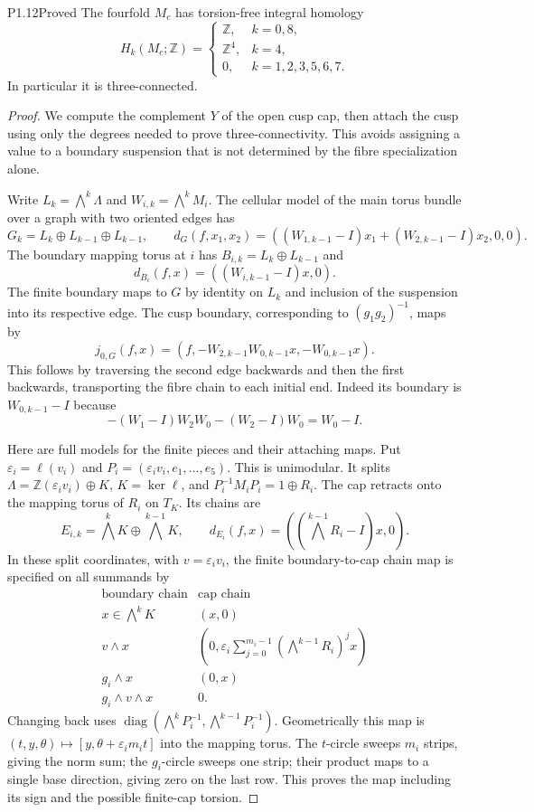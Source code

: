\begin{statement}{P1.12}{Proved}
The fourfold $M_c$ has torsion-free integral homology
\[
H_k(M_c;\mathbb Z)=
\begin{cases}
\mathbb Z,&k=0,8,\\
\mathbb Z^4,&k=4,\\
0,&k=1,2,3,5,6,7.
\end{cases}
\]
In particular it is three-connected.
\end{statement}
\begin{proof}
We compute the complement $Y$ of the open cusp cap, then attach the
cusp using only the degrees needed to prove three-connectivity.
This avoids assigning a value to a boundary suspension that is not
determined by the fibre specialization alone.

Write $L_k=\bigwedge^k\Lambda$ and $W_{i,k}=\bigwedge^kM_i$.
The cellular model of the main torus bundle over a graph with two
oriented edges has
\[
G_k=L_k\oplus L_{k-1}\oplus L_{k-1},\qquad
d_G(f,x_1,x_2)=((W_{1,k-1}-I)x_1+(W_{2,k-1}-I)x_2,0,0).
\tag{1.12.1}
\]
The boundary mapping torus at $i$ has
$B_{i,k}=L_k\oplus L_{k-1}$ and
\[
d_{B_i}(f,x)=((W_{i,k-1}-I)x,0).
\tag{1.12.2}
\]
The finite boundary maps to $G$ by identity on $L_k$ and inclusion
of the suspension into its respective edge.  The cusp boundary,
corresponding to $(g_1g_2)^{-1}$, maps by
\[
j_{0,G}(f,x)=(f,-W_{2,k-1}W_{0,k-1}x,-W_{0,k-1}x).
\tag{1.12.3}
\]
This follows by traversing the second edge backwards and then the
first backwards, transporting the fibre chain to each initial end.
Indeed its boundary is $W_{0,k-1}-I$ because
\[
-(W_1-I)W_2W_0-(W_2-I)W_0=W_0-I.
\]

Here are full models for the finite pieces and their attaching maps.
Put $\varepsilon_i=\ell(v_i)$ and
$P_i=(\varepsilon_iv_i,e_1,\ldots,e_5)$.
This is unimodular.  It splits
$\Lambda=\mathbb Z(\varepsilon_iv_i)\oplus K$, $K=\ker\ell$,
and $P_i^{-1}M_iP_i=1\oplus R_i$.
The cap retracts onto the mapping torus of $R_i$ on $T_K$.
Its chains are
\[
E_{i,k}=\bigwedge^kK\oplus\bigwedge^{k-1}K,
\qquad d_{E_i}(f,x)=((\bigwedge^{k-1}R_i-I)x,0).
\tag{1.12.4}
\]
In these split coordinates, with $v=\varepsilon_iv_i$, the finite
boundary-to-cap chain map is specified on all summands by
\[
\begin{array}{c|c}
\text{boundary chain}&\text{cap chain}\\\hline
x\in\bigwedge^kK&(x,0)\\
v\wedge x&(0,\varepsilon_i\sum_{j=0}^{m_i-1}
                  (\bigwedge^{k-1}R_i)^jx)\\
g_i\wedge x&(0,x)\\
g_i\wedge v\wedge x&0.
\end{array}
\tag{1.12.5}
\]
Changing back uses
$\operatorname{diag}(\bigwedge^kP_i^{-1},
\bigwedge^{k-1}P_i^{-1})$.
Geometrically this map is
$(t,y,\theta)\mapsto[y,\theta+\varepsilon_im_it]$ into the mapping
torus.  The $t$-circle sweeps $m_i$ strips, giving the norm sum; the
$g_i$-circle sweeps one strip; their product maps to a single
base direction, giving zero on the last row.  This proves the map
including its sign and the possible finite-cap torsion.


\end{proof}
